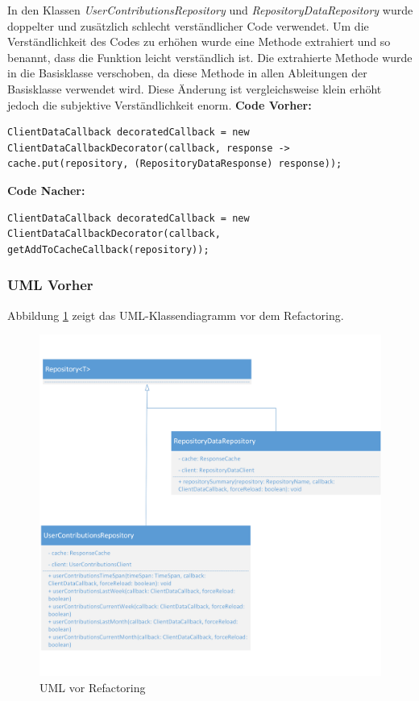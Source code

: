 \documentclass[12pt]{article}
\begin{document}
In den Klassen \textit{UserContributionsRepository} und \textit{RepositoryDataRepository} wurde doppelter und zusätzlich schlecht verständlicher Code verwendet. Um die Verständlichkeit des Codes zu erhöhen wurde eine Methode extrahiert und so benannt, dass die Funktion leicht verständlich ist. Die extrahierte Methode wurde in die Basisklasse verschoben, da diese Methode in allen Ableitungen der Basisklasse verwendet wird. Diese Änderung ist vergleichsweise klein erhöht jedoch die subjektive Verständlichkeit enorm.
\newline
\newline
\textbf{Code Vorher:}
\begin{lstlisting}
ClientDataCallback decoratedCallback = new ClientDataCallbackDecorator(callback, response ->  cache.put(repository, (RepositoryDataResponse) response));
\end{lstlisting}
\textbf{Code Nacher:} 
\begin{lstlisting}
ClientDataCallback decoratedCallback = new ClientDataCallbackDecorator(callback, getAddToCacheCallback(repository));
\end{lstlisting}

\newpage
\subsubsection{UML Vorher}
Abbildung \ref{fig:ExtractMethod_Refactoring_Before} zeigt das UML-Klassendiagramm vor dem Refactoring.
\begin{figure}[h]
  \includegraphics{refactoring_extract_method_repository_before.png}
  \centering
  \caption{UML vor Refactoring}
  \label{fig:ExtractMethod_Refactoring_Before}
\end{figure}
\end{document}
